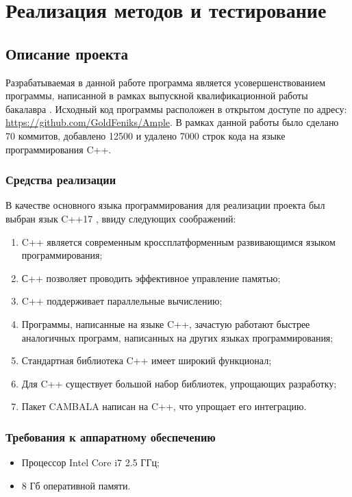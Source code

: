 \documentclass[../document.tex]{subfiles}
\begin{document}
    \section{Реализация методов и тестирование}
        \subsection{Описание проекта}
            \par \par Разрабатываемая в данной работе программа является усовершенствованием программы, написанной в рамках выпускной квалификационной работы бакалавра \cite{bachelor}. Исходный код программы расположен в открытом доступе по адресу: \url{https://github.com/GoldFeniks/Ample}. В рамках данной работы было сделано 70 коммитов, добавлено 12500 и удалено 7000 строк кода на языке программирования C++.  
            \subsubsection{Средства реализации}
                \par В качестве основного языка программирования для реализации проекта был выбран язык C++17 \cite{c++}, ввиду следующих соображений:
                \begin{enumerate}
                    \item C++ является современным кроссплатформенным развивающимся языком программирования;
                    \item С++ позволяет проводить эффективное управление памятью;
                    \item C++ поддерживает параллельные вычислению;
                    \item Программы, написанные на языке C++, зачастую работают быстрее аналогичных программ, написанных на других языках программирования;
                    \item Стандартная библиотека C++ имеет широкий функционал;
                    \item Для C++ существует большой набор библиотек, упрощающих разработку;
                    \item Пакет CAMBALA \cite{cambala} написан на C++, что упрощает его интеграцию.
                \end{enumerate}
            \subsubsection{Требования к аппаратному обеспечению}
                \begin{itemize}
                    \item Процессор Intel Core i7 2.5 ГГц;
                    \item 8 Гб оперативной памяти.
                \end{itemize}
\end{document}
